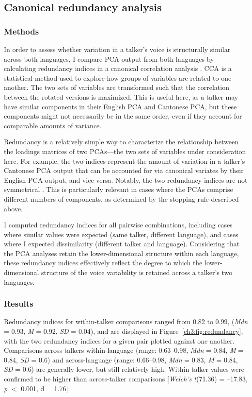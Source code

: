 \subsection{Canonical redundancy analysis}\label{ch3:sec:cca}
\subsubsection{Methods}
In order to assess whether variation in a talker's voice is structurally similar across both languages, I compare PCA output from both languages by calculating redundancy indices in a canonical correlation analysis \citep[CCA][]{stewart_1968_canonical, jolliffe_2002_pca}.  CCA is a statistical method used to explore how groups of variables are related to one another. The two sets of variables are transformed such that the correlation between the rotated versions is maximized. This is useful here, as a talker may have similar components in their English PCA and Cantonese PCA, but these components might not necessarily be in the same order, even if they account for comparable amounts of variance.

Redundancy is a relatively simple way to characterize the relationship between the loadings matrices of two PCAs---the two sets of variables under consideration here. For example, the two indices represent the amount of variation in a talker's Cantonese PCA output that can be accounted for via canonical variates by their English PCA output, and vice versa. Notably, the two redundancy indices are not symmetrical \citep{stewart_1968_canonical}. This is particularly relevant in cases where the PCAs comprise different numbers of components, as determined by the stopping rule described above.

I computed redundancy indices for all pairwise combinations, including cases where similar values were expected (same talker, different language), and cases where I expected dissimilarity (different talker and language). Considering that the PCA analyses retain the lower-dimensional structure within each language, these redundancy indices effectively reflect the degree to which the lower-dimensional structure of the voice variability is retained across a talker's two languages.

\subsubsection{Results}


Redundancy indices for within-talker comparisons ranged from 0.82 to 0.99, (\textit{Mdn} = 0.93, \textit{M} = 0.92, \textit{SD} = 0.04), and are displayed in Figure~\ref{ch3:fig:redundancy}, with the two redundancy indices for a given pair plotted against one another. Comparisons across talkers within-language (range: 0.63--0.98, \textit{Mdn} = 0.84, \textit{M} = 0.84, \textit{SD} = 0.6) and across-language (range: 0.66--0.98, \textit{Mdn} = 0.83, \textit{M} = 0.84, \textit{SD} = 0.6) are generally lower, but still relatively high. Within-talker values were confirmed to be higher than across-talker comparisons [\textit{Welch's t}(71.36) = --17.83, \textit{p} $<$ 0.001, d = 1.76]. 

